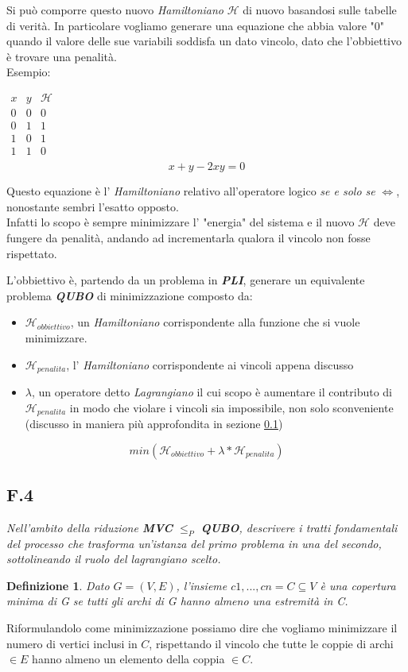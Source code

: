 \documentclass[a4paper]{article}
\newtheorem*{definition}{Definizione}
\newcommand{\imp}[1]{\textbf{\textit{#1}}}
\begin{document}
Si può comporre questo nuovo \textit{Hamiltoniano} $\mathcal{H}$ di nuovo basandosi sulle tabelle di verità.
In particolare vogliamo generare una equazione che abbia valore "$0$" quando il valore delle sue variabili soddisfa un dato vincolo, dato che l'obbiettivo è trovare una penalità.\\
Esempio:
\begin{center}$\begin{array}{c|c|c}
 x & y & \mathcal{H}\\
\hline
 0 & 0 & 0  \\ 
 0 & 1 & 1  \\
 1 & 0 & 1  \\
 1 & 1 & 0  \\ %
\end{array}$
$$ x + y -2xy = 0$$
\end{center}
Questo equazione è l' \textit{Hamiltoniano} relativo all'operatore logico \textit{se e solo se} $ \Leftrightarrow$, nonostante sembri l'esatto opposto.\\
Infatti lo scopo è sempre minimizzare l' "energia" del sistema e il nuovo $\mathcal{H}$ deve fungere da penalità, andando ad incrementarla qualora il vincolo non fosse rispettato.

L'obbiettivo è, partendo da un problema in \imp{PLI}, generare un equivalente problema \imp{QUBO} di minimizzazione composto da: 
\begin{itemize}
	\item $\mathcal{H}_{obbiettivo}$, un \textit{Hamiltoniano} corrispondente alla funzione che si vuole minimizzare.
	\item $\mathcal{H}_{penalita}$, l' \textit{Hamiltoniano} corrispondente ai vincoli appena discusso
	\item $\lambda$, un operatore detto \textit{Lagrangiano} il cui scopo è aumentare il contributo di $\mathcal{H}_{penalita}$ in modo che violare i vincoli sia impossibile, non solo sconveniente (discusso in maniera più approfondita in sezione \ref{SEC:F4})
\end{itemize} 
$$ min(\mathcal{H}_{obbiettivo} + \lambda * \mathcal{H}_{penalita})$$

\subsection{F.4}
\label{SEC:F4}
\emph{Nell’ambito della riduzione \textbf{MVC} $\leq_P$ \textbf{QUBO}, descrivere i tratti fondamentali del processo che trasforma un’istanza del primo problema in una del secondo, sottolineando il ruolo del lagrangiano scelto.}
\begin{definition}
	Dato $G = (V, E)$, l’insieme ${c1,. . . , cn} = C \subseteq V$ è una copertura minima di G se tutti gli archi di G hanno almeno una estremità in C.
\end{definition}
Riformulandolo come minimizzazione possiamo dire che vogliamo minimizzare il numero di vertici inclusi in $C$, rispettando il vincolo che tutte le coppie di archi $\in E$ hanno almeno un elemento della coppia $\in C$.
\end{document}
